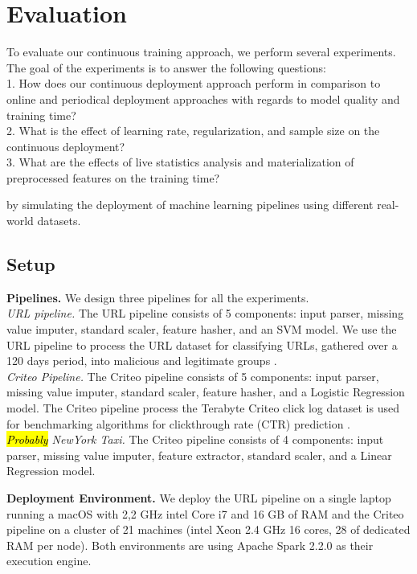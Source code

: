 \section{Evaluation} \label{evaluation} 
To evaluate our continuous training approach, we perform several experiments.
The goal of the experiments is to answer the following questions:\\
1. How does our continuous deployment approach perform in comparison to online and periodical deployment approaches with regards to model quality and training time? \\
2. What is the effect of learning rate, regularization, and sample size on the continuous deployment? \\
3. What are the effects of live statistics analysis and materialization of preprocessed features on the training time?

by simulating the deployment of machine learning pipelines using different real-world datasets.

\subsection{Setup}\label{subsec:setup}
\textbf{Pipelines.}
We design three pipelines for all the experiments.\\
\textit{URL pipeline. } The URL pipeline consists of 5 components: input parser, missing value imputer, standard scaler, feature hasher, and an SVM model.
We use the URL pipeline to process the URL dataset for classifying URLs, gathered over a 120 days period, into malicious and legitimate groups \cite{ma2009identifying}.\\
\textit{Criteo Pipeline.} 
The Criteo pipeline consists of 5 components: input parser, missing value imputer, standard scaler, feature hasher, and a Logistic Regression model.
The Criteo pipeline process the Terabyte Criteo click log dataset is used for benchmarking algorithms for clickthrough rate (CTR) prediction \cite{criteo-log}.\\
\textit{\hl{Probably} NewYork Taxi.}
The Criteo pipeline consists of 4 components: input parser, missing value imputer, feature extractor, standard scaler, and a Linear Regression model.

\textbf{Deployment Environment. }
We deploy the URL pipeline on a single laptop running a macOS with 2,2 GHz intel Core i7 and 16 GB of RAM and the Criteo pipeline on a cluster of 21 machines (intel Xeon 2.4 GHz 16 cores, 28 of dedicated RAM per node).
Both environments are using Apache Spark 2.2.0 as their execution engine.

